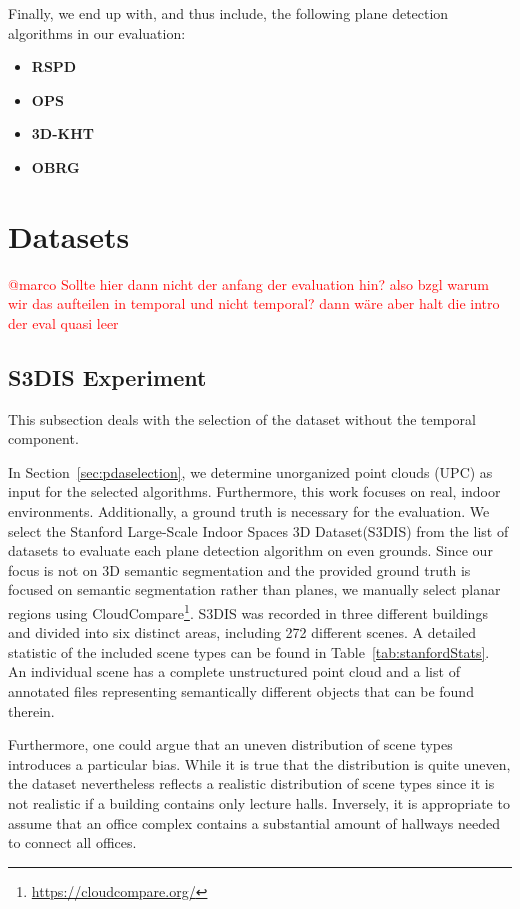 \documentclass[main.tex]{subfiles}
\begin{document}
Finally, we end up with, and thus include, the following plane detection algorithms in our evaluation:

\begin{itemize}
    \item \textbf{RSPD}
    \item \textbf{OPS}
    \item \textbf{3D-KHT}
    \item \textbf{OBRG}
\end{itemize}

\section{Datasets}

\textcolor{red}{@marco Sollte hier dann nicht der anfang der evaluation hin? also bzgl warum wir das aufteilen in temporal und nicht temporal? dann wäre aber halt die intro der eval quasi leer}

\subsection{S3DIS Experiment}
This subsection deals with the selection of the dataset without the temporal component.

In Section~\ref{sec:pdaselection}, we determine unorganized point clouds (UPC) as input for the selected algorithms. Furthermore, this work focuses on real, indoor environments.
Additionally, a ground truth is necessary for the evaluation.
We select the Stanford Large-Scale Indoor Spaces 3D Dataset(S3DIS)\cite{2017arXiv170201105A} from the list of datasets to evaluate each plane detection algorithm on even grounds.
Since our focus is not on 3D semantic segmentation and the provided ground truth is focused on semantic segmentation rather than planes, we manually select planar regions using CloudCompare\footnote{\href{https://cloudcompare.org/}{https://cloudcompare.org/}}.
S3DIS was recorded in three different buildings and divided into six distinct areas, including 272 different scenes. A detailed statistic of the included scene types can be found in Table~\ref{tab:stanfordStats}.
An individual scene has a complete unstructured point cloud and a list of annotated files representing semantically different objects that can be found therein.

Furthermore, one could argue that an uneven distribution of scene types introduces a particular bias. While it is true that the distribution is quite uneven, the dataset nevertheless reflects a realistic distribution of scene types since
it is not realistic if a building contains only lecture halls. Inversely, it is appropriate to assume that an office complex contains a substantial amount of hallways needed to connect all offices.
\end{document}
